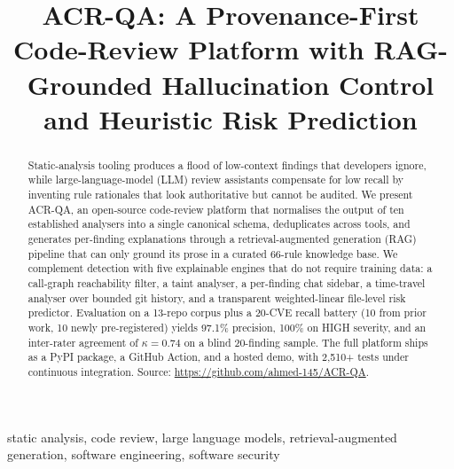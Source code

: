 \documentclass[conference]{IEEEtran}
\begin{document}
\title{ACR-QA: A Provenance-First Code-Review Platform with RAG-Grounded Hallucination Control and Heuristic Risk Prediction}

\author{
  \and
}

\maketitle

\begin{abstract}
Static-analysis tooling produces a flood of low-context findings that developers
ignore, while large-language-model (LLM) review assistants compensate for low
recall by inventing rule rationales that look authoritative but cannot be
audited. We present ACR-QA, an open-source code-review platform that normalises
the output of ten established analysers into a single canonical schema,
deduplicates across tools, and generates per-finding explanations through a
retrieval-augmented generation (RAG) pipeline that can only ground its prose in
a curated 66-rule knowledge base. We complement detection with five
explainable engines that do not require training data: a call-graph
reachability filter, a taint analyser, a per-finding chat sidebar, a
time-travel analyser over bounded git history, and a transparent
weighted-linear file-level risk predictor. Evaluation on a 13-repo corpus
plus a 20-CVE recall battery (10 from prior work, 10 newly pre-registered)
yields 97.1\% precision, 100\% on HIGH severity, and an inter-rater agreement
of $\kappa=0.74$ on a blind 20-finding sample. The full platform ships as a
PyPI package, a GitHub Action, and a hosted demo, with 2{,}510+ tests
under continuous integration. Source: \url{https://github.com/ahmed-145/ACR-QA}.
\end{abstract}

\begin{IEEEkeywords}
static analysis, code review, large language models, retrieval-augmented generation, software engineering, software security
\end{IEEEkeywords}
\end{document}

